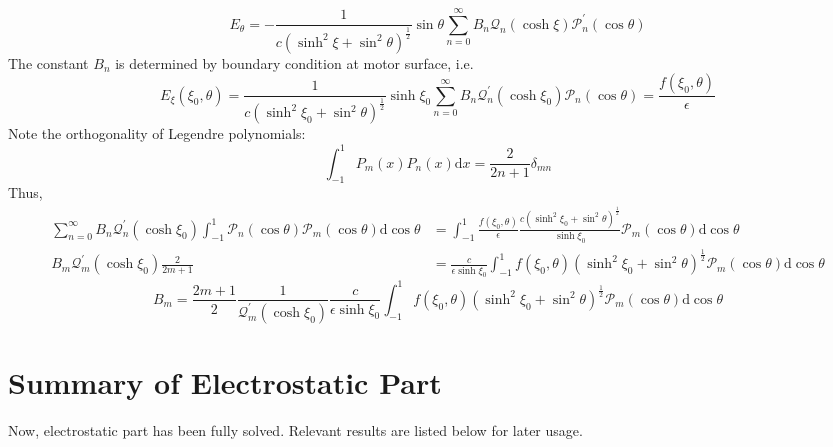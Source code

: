 \documentclass[fontsize=11pt, %
                             paper=a4, %
                             twoside, %
                             captions=tableheading,
                             index=totoc,
                             hyperref]{labbook}
\begin{document}
\begin{addmargin}[4cm]{0cm}
\begin{equation}
\end{equation}
\begin{equation}
E_\theta=-\frac{1}{c(\sinh^2\xi+\sin^2\theta)^{\frac{1}{2}}}\sin\theta\sum_{n=0}^\infty B_n\mathscr{Q}_n(\cosh\xi)\mathscr{P}_n^\prime(\cos\theta)
\end{equation}
The constant $B_n$ is determined by boundary condition at motor surface, i.e.
\begin{equation}
E_\xi(\xi_0,\theta)=\frac{1}{c(\sinh^2\xi_0+\sin^2\theta)^{\frac{1}{2}}}\sinh\xi_0\sum_{n=0}^\infty B_n \mathscr{Q}_n^\prime(\cosh\xi_0)\mathscr{P}_n(\cos\theta)=\frac{f(\xi_0,\theta)}{\epsilon}
\end{equation}
Note the orthogonality of Legendre polynomials:
\begin{equation}
\int_{-1}^{1}P_m(x)P_n(x)\mathrm{d}x=\frac{2}{2n+1}\delta_{mn}
\end{equation}
Thus,
\begin{equation}
\begin{aligned}
\sum_{n=0}^\infty B_n \mathscr{Q}^\prime_{n}(\cosh\xi_0)\int_{-1}^1\mathscr{P}_n(\cos\theta)\mathscr{P}_m(\cos\theta)\mathrm{d}\cos\theta&=\int_{-1}^1\frac{f(\xi_0,\theta)}{\epsilon}\frac{c(\sinh^2\xi_0+\sin^2\theta)^{\frac{1}{2}}}{\sinh\xi_0}\mathscr{P}_m(\cos\theta)\mathrm{d}\cos\theta\\
B_m\mathscr{Q}_m^\prime(\cosh\xi_0)\frac{2}{2m+1}&=\frac{c}{\epsilon\sinh\xi_0}\int_{-1}^1f(\xi_0,\theta)(\sinh^2\xi_0+\sin^2\theta)^{\frac{1}{2}}\mathscr{P}_m(\cos\theta)\mathrm{d}\cos\theta
\end{aligned}
\end{equation}
\begin{equation}
B_m=\frac{2m+1}{2}\frac{1}{\mathscr{Q}_m^\prime(\cosh\xi_0)}\frac{c}{\epsilon\sinh\xi_0}\int_{-1}^1f(\xi_0,\theta)(\sinh^2\xi_0+\sin^2\theta)^{\frac{1}{2}}\mathscr{P}_m(\cos\theta)\mathrm{d}\cos\theta
\end{equation}
\section{Summary of Electrostatic Part}
Now, electrostatic part has been fully solved. Relevant results are listed below for later usage.

\end{addmargin}
\end{document}
